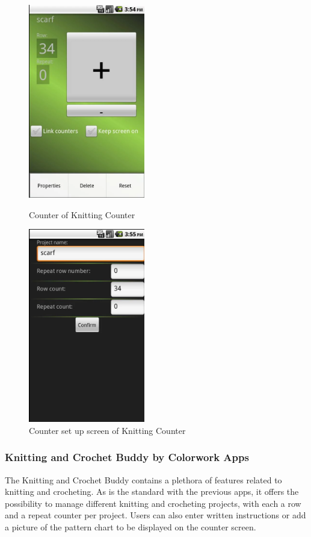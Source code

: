\documentclass[a4paper,11pt]{kth-mag}
\begin{document}
\begin{figure}[H]
\centering
\begin{minipage}{.5\textwidth}
  \centering
  \includegraphics[width=2in]{images/image12.png}
  \caption{Counter of Knitting Counter    }
  \label{fig_knittingcounter1}
\end{minipage}%
\begin{minipage}{.5\textwidth}
  \centering
  \includegraphics[width=2in]{images/image06.png}
  \caption{Counter set up screen of Knitting Counter}
  \label{fig_knittingcounter2}
\end{minipage}
\end{figure}

\subsubsection{Knitting and Crochet Buddy by Colorwork Apps}
The Knitting and Crochet Buddy contains a plethora of features related to
knitting and crocheting. As is the standard with the previous apps, it offers
the possibility to manage different knitting and crocheting projects, with each
a row and a repeat counter per project. Users can also enter written
instructions or add a picture of the pattern chart to be displayed on the
counter screen.
\end{document}
